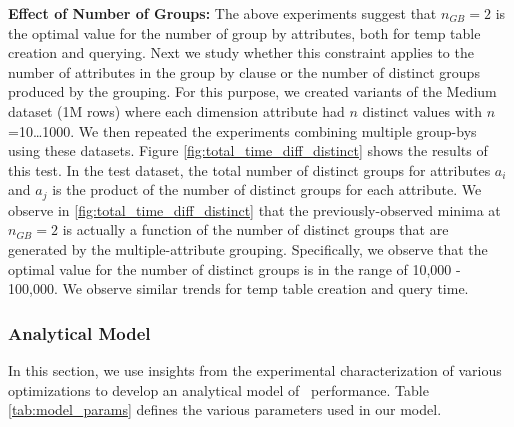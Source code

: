 {\bf Effect of Number of Groups:} The above experiments suggest that $n_{GB}=2$
is the optimal value for the number of group by attributes, both for temp table
creation and querying.
Next we study whether this constraint applies to the number of attributes in the
group by clause or the number of distinct groups produced by the grouping. For
this purpose, we created variants of the Medium dataset (1M rows) where each
dimension attribute had $n$ distinct values with $n$=10\ldots1000. We then
repeated the experiments combining multiple group-bys using these datasets.
Figure \ref{fig:total_time_diff_distinct} shows the results of this test. In the
test dataset, the total number of distinct groups for attributes $a_i$ and $a_j$
is the product of the number of distinct groups for each attribute. We observe
in \ref{fig:total_time_diff_distinct} that the previously-observed minima at
$n_{GB}=2$ is actually a function of the number of distinct groups that are
generated by the multiple-attribute grouping.
Specifically, we observe that the optimal value for the number of distinct
groups is in the range of 10,000 - 100,000. We observe similar trends for temp
table creation and query time.



\subsubsection{Analytical Model}
\label{sec:model}
In this section, we use insights from the experimental characterization of
various optimizations to develop an analytical model of \SeeDB\ performance.
Table \ref{tab:model_params} defines the various parameters used in our model.

